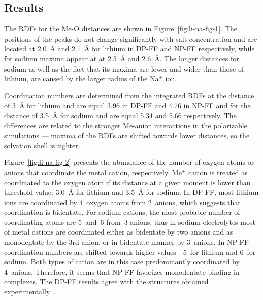 \subsection{Results}

The RDFs for the Me-O distances are shown in Figure~\ref{fig:li-na-fig-1}. The positions of the peaks do not change significantly with salt concentration and are located at 2.0~{\AA} and 2.1~{\AA} for lithium in DP-FF and NP-FF respectively, while for sodium maxima appear at at 2.5~{\AA} and 2.6~{\AA}. The longer distances for sodium as well as the fact that its maxima are lower and wider than those of lithium, are caused by the larger radius of the Na$^{+}$ ion. 

Coordination numbers are determined from the integrated RDFs at the distance of 3~{\AA} for lithium and are equal 3.96 in DP-FF and 4.76 in NP-FF and for the distance of 3.5~{\AA} for sodium and are equal 5.34 and 5.66 respectively. The differences are related to the stronger Me-anion interactions in the polarizable simulations --- maxima of the RDFs are shifted towards lower distances, so the solvation shell is tighter.

Figure~\ref{fig:li-na-fig-2} presents the abundance of the number of oxygen atoms or anions that coordinate the metal cation, respectively. Me$^{+}$ cation is treated as coordinated to the oxygen atom if its distance at a given moment is lower than threshold value: 3.0~{\AA} for lithium and 3.5~{\AA} for sodium. In DP-FF, most lithium ions are coordinated by 4~oxygen atoms from 2~anions, which suggests that coordination is bidentate. For sodium cations, the most probable number of coordinating atoms are 5~and~6 from~3 anions, thus in sodium electrolytes most of metal cations are coordinated either as bidentate by two anions and as monodentate by the 3rd anion, or in bidentate manner by 3~anions. In NP-FF coordination numbers are shifted towards higher values - 5~for lithium and 6~for sodium. Both types of cation are in this case predominantly coordinated by 4~anions. Therefore, it seems that NP-FF favorizes monodentate binding in complexes. The DP-FF results agree with the structures obtained experimentally~\cite{li-na-exp-1}.

